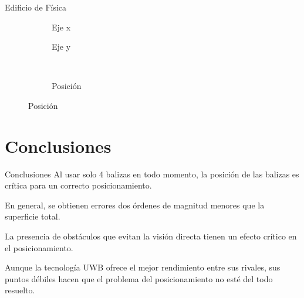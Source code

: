 \documentclass{beamer}
\begin{document}
  \begin{frame}{Edificio de Física}
    \begin{figure}[H]
      \centering
        \begin{subfigure}[b]{.3\textwidth}
          \centering
          \hspace*{-0.8cm}
           
          \caption{Eje x}
          \label{fig:boxplot_fisica_x}
        \end{subfigure}
        \hspace*{0.1cm}
        \begin{subfigure}[b]{.3\textwidth}
          \centering
            
          \caption{Eje y}
          \label{fig:boxplot_fisica_y}
        \end{subfigure}
        ~~~~
        \begin{subfigure}[b]{.3\textwidth}
            \centering
              
            \caption{Posición}
            \label{fig:boxplot_fisica_pos}
          \end{subfigure}
        \label{fig:boxplot_fisica}
    \end{figure}
  \end{frame}

\section{Conclusiones}
\begin{frame}{Conclusiones}
  Al usar solo 4 balizas en todo momento, la posición de las balizas es crítica para un correcto posicionamiento.

  En general, se obtienen errores dos órdenes de magnitud menores que la superficie total.

  La presencia de obstáculos que evitan la visión directa tienen un efecto crítico en el posicionamiento.

 Aunque la tecnología UWB ofrece el mejor rendimiento entre sus rivales, sus puntos débiles hacen que el problema del posicionamiento no esté del todo resuelto. 
\end{frame}
\end{document}
